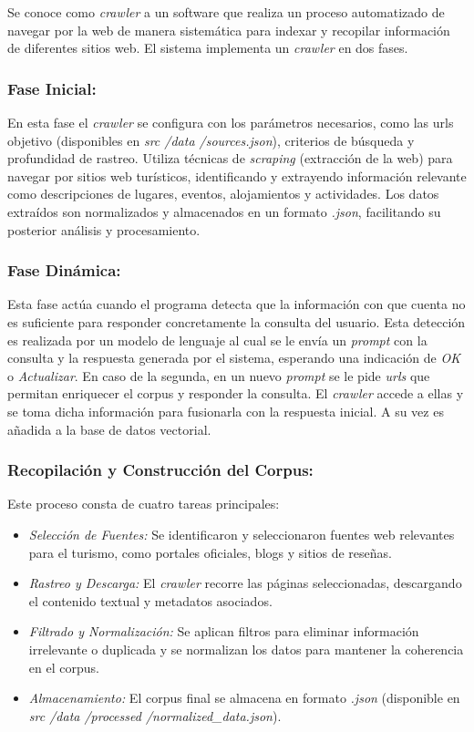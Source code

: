\documentclass[10pt]{llncs}
\begin{document}
Se conoce como \textit{crawler} a un software que realiza un proceso automatizado de navegar por la web de manera sistemática para indexar y recopilar
información de diferentes sitios web. El sistema implementa un \textit{crawler} en dos fases.

\subsubsection{Fase Inicial:} En esta fase el \textit{crawler} se configura con los parámetros necesarios, como las urls objetivo (disponibles en \textit{src /data /sources.json}), 
criterios de búsqueda y profundidad de rastreo. Utiliza técnicas de \textit{scraping} (extracción de la web) para navegar por sitios web turísticos, identificando y extrayendo 
información relevante como descripciones de lugares, eventos, alojamientos y actividades. Los datos extraídos son normalizados y almacenados en un formato \textit{.json}, facilitando su posterior análisis y procesamiento.

\subsubsection{Fase Dinámica:} Esta fase actúa cuando el programa detecta que la información con que cuenta no es suficiente para responder concretamente la consulta del usuario. Esta detección es realizada por un modelo de 
lenguaje al cual se le envía un \textit{prompt} con la consulta y la respuesta generada por el sistema, esperando una indicación de \textit{OK} o \textit{Actualizar}. En caso de la segunda, en un nuevo \textit{prompt} se le pide 
\textit{urls} que permitan enriquecer el corpus y responder la consulta. El \textit{crawler} accede a ellas y se toma dicha información para fusionarla con la respuesta inicial. A su vez es añadida a la base de datos 
vectorial.

\subsubsection{Recopilación y Construcción del Corpus:} Este proceso consta de cuatro tareas principales:

\begin{itemize}
    \item \textit{Selección de Fuentes:} Se identificaron y seleccionaron fuentes web relevantes para el turismo, como portales oficiales, blogs y sitios de reseñas.
    \item \textit{Rastreo y Descarga:} El \textit{crawler} recorre las páginas seleccionadas, descargando el contenido textual y metadatos asociados.
    \item \textit{Filtrado y Normalización:} Se aplican filtros para eliminar información irrelevante o duplicada y se normalizan los datos para mantener la coherencia en el corpus.
    \item \textit{Almacenamiento:} El corpus final se almacena en formato \textit{.json} (disponible en \textit{src /data /processed /normalized\_data.json}).
\end{itemize}
\end{document}
